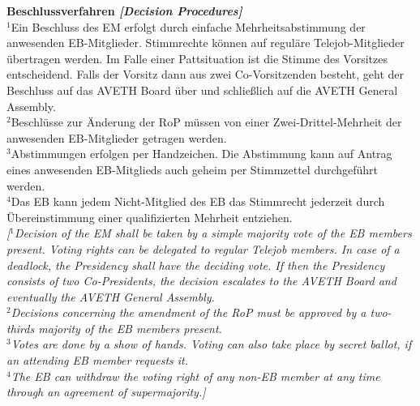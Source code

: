 \documentclass[10pt]{article}
\newcounter{qcounter}
\begin{document}
\begin{list}{{\bf Artikel :~}}{}
\item {\bf Beschlussverfahren {\it[Decision Procedures]}}\label{EMDecisionProcedure}\\
$^{1}$Ein Beschluss des EM erfolgt durch einfache Mehrheitsabstimmung der anwesenden EB-Mitglieder. Stimmrechte können auf reguläre Telejob-Mitglieder übertragen werden. Im Falle einer Pattsituation ist die Stimme des Vorsitzes entscheidend. Falls der Vorsitz dann aus zwei Co-Vorsitzenden besteht, geht der Beschluss auf das AVETH Board über und schließlich auf die AVETH General Assembly.\\
$^{2}$Beschlüsse zur Änderung der RoP müssen von einer Zwei-Drittel-Mehrheit der anwesenden EB-Mitglieder getragen werden.\\
$^{3}$Abstimmungen erfolgen per Handzeichen. Die Abstimmung kann auf Antrag eines anwesenden EB-Mitglieds auch geheim per Stimmzettel durchgeführt werden.\\
$^{4}$Das EB kann jedem Nicht-Mitglied des EB das Stimmrecht jederzeit durch
Übereinstimmung einer qualifizierten Mehrheit entziehen.\\

{\it[$^{1}$Decision of the EM shall be taken by a simple majority vote of the EB members present. Voting rights can be delegated to regular Telejob members. In case of a deadlock, the Presidency shall have the deciding vote. If then the Presidency consists of two Co-Presidents, the decision escalates to the AVETH Board and eventually the AVETH General Assembly.\\
$^{2}$Decisions concerning the amendment of the RoP must be approved by a two-thirds majority of the EB members present.\\
$^{3}$Votes are done by a show of hands. Voting can also take place by secret ballot, if an attending EB member requests it. \\
$^{4}$The EB can withdraw the voting right of any non-EB member at any time through an agreement of supermajority.]}


\end{list}
\end{document}
